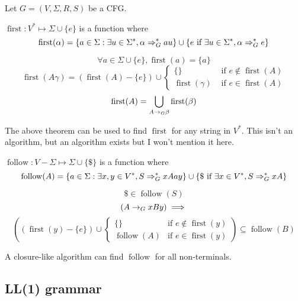 Let $G = (V, \Sigma, R, S)$ be a CFG.

\begin{definition}
$\operatorname{first}: V^* \mapsto \Sigma \cup \{e\}$ is a function where
\[ \operatorname{first}(\alpha) =
\{ a \in \Sigma: \exists u \in \Sigma^*, \alpha \Rightarrow_{G}^* au \}
\cup \{e \textrm{ if } \exists u \in \Sigma^*, \alpha \Rightarrow_{G}^* e \} \]
\end{definition}

\begin{theorem}
\[ \forall a \in \Sigma \cup \{e\}, \operatorname{first}(a) = \{a\} \]
\[ \operatorname{first}(A\gamma) = (\operatorname{first}(A) - \{e\}) \cup \begin{cases}
\{\} & \textrm{ if } e \not\in \operatorname{first}(A) \\
\operatorname{first}(\gamma) & \textrm{ if } e \in \operatorname{first}(A)
\end{cases} \]
\[ \operatorname{first}(A) = \bigcup_{A \rightarrow_{G} \beta} \operatorname{first}(\beta) \]
\end{theorem}

The above theorem can be used to find $\operatorname{first}$ for any string in $V^*$.
This isn't an algorithm, but an algorithm exists but I won't mention it here.

\begin{definition}
$\operatorname{follow}: V - \Sigma \mapsto \Sigma \cup \{\$\}$ is a function where
\[ \operatorname{follow}(A) = \{a \in \Sigma: \exists x, y \in V^*, S \Rightarrow_{G}^* xAay \}
\cup \{\$ \textrm{ if } \exists x \in V^*, S \Rightarrow_{G}^* xA \} \]
\end{definition}

\begin{theorem}
\[ \$ \in \operatorname{follow}(S) \]
\[ (A \rightarrow_{G} xBy) \implies \]
\[ \left( (\operatorname{first}(y) - \{e\}) \cup \begin{cases}
\{\} & \textrm{if } e \not\in \operatorname{first}(y)
\\ \operatorname{follow}(A) & \textrm{if } e \in \operatorname{first}(y)
\end{cases} \right) \subseteq \operatorname{follow}(B)\]
\end{theorem}

A closure-like algorithm can find $\operatorname{follow}$ for all non-terminals.

\subsection{LL(1) grammar}

